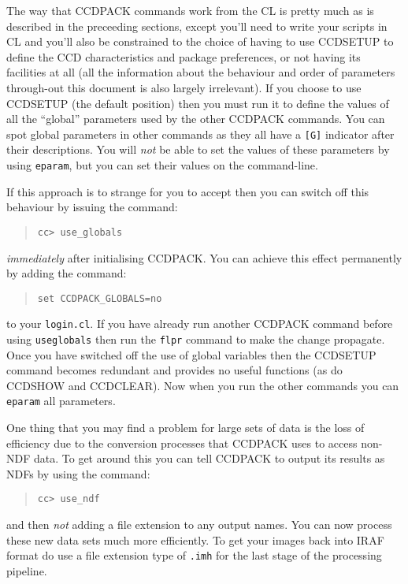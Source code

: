 \documentclass[twoside,11pt]{article}
\renewcommand{\_}{\texttt{\symbol{95}}}
\newcommand{\text}[1]{{\small \tt #1}}
\newcommand{\routine}[1]{{\sc #1}}
\begin{document}
The way that CCDPACK commands work from the CL is pretty much as is
described in the preceeding sections, except you'll need to write your
scripts in CL and you'll also be constrained to the choice of having
to use \routine{CCDSETUP} to define the CCD characteristics and
package preferences, or not having its facilities at all (all the
information about the behaviour and order of parameters through-out
this document is also largely irrelevant). If you choose to use
\routine{CCDSETUP} (the default position) then you must run it to
define the values of all the ``global'' parameters used by the other
CCDPACK commands. You can spot global parameters in other commands as
they all have a \verb+[G]+ indicator after their descriptions. You
will {\em{not}} be able to set the values of these parameters by using
\verb+eparam+, but you can set their values on the command-line.

If this approach is to strange for you to accept then you can switch
off this behaviour by issuing the command:
\begin{quote}
\begin{verbatim}
cc> use_globals
\end{verbatim}
\end{quote}
{\em{immediately}} after initialising CCDPACK. You can achieve this effect
permanently by adding the command:
\begin{quote}
\begin{verbatim}
set CCDPACK_GLOBALS=no
\end{verbatim}
\end{quote}
to your \text{login.cl}. If you have already run another CCDPACK
command before using \text{use\_globals} then run the \text{flpr}
command to make the change propagate. Once you have switched off the
use of global variables then the \routine{CCDSETUP} command becomes
redundant and provides no useful functions (as do \routine{CCDSHOW}
and \routine{CCDCLEAR}). Now when you run the other
commands you can \text{eparam} all parameters.

One thing that you may find a problem for large sets of data is the
loss of efficiency due to the conversion processes that CCDPACK uses
to access non-NDF data. To get around this you can tell CCDPACK to
output its results as NDFs by using the command:
\begin{quote}
\begin{verbatim}
cc> use_ndf
\end{verbatim}
\end{quote}
and then {\em{not}} adding a file extension to any output names. You can
now process these new data sets much more efficiently. To get your
images back into IRAF format do use a file extension type of
\text{.imh} for the last stage of the processing pipeline.
\end{document}
